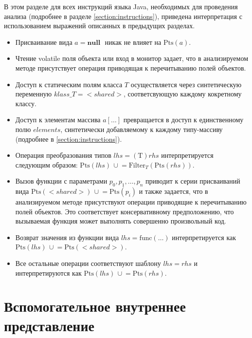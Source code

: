 \documentclass[14pt,titlepage]{extarticle}
\newcommand{\NULL}{\textbf{null }}
\newcommand{\Pts}[1]{\textrm{Pts}(#1)}
\newcommand{\Filter}[2]{\textrm{Filter}_{#1}(#2)}
\newcommand{\cupe}{\,\cup\!\!=}
\newcommand{\eng}[1]{{\English#1}}
\let\oldsection\section
\renewcommand{\section}{\newpage\oldsection}
\begin{document}
      В этом разделе для всех инструкций языка Java, необходимых для проведения
      анализа (подробнее в разделе \ref{section:instructions}), приведена
      интерпретация с использованием выражений описанных в предыдущих разделах.
      \begin{itemize}
        \item Присваивание вида $a = \NULL$ никак не влияет на $\Pts{a}$.
        \item Чтение \eng{volatile} поля объекта или вход в монитор задает, что
              в анализируемом методе присутствует операция приводящая к
              перечитыванию полей объектов.
        \item Доступ к статическим полям класса $T$ осуществляется через
              синтетическую переменную $klass\_T = {<}shared{>}$,
              соответсвующую каждому кокретному классу.
        \item Доступ к элементам массива $a[\ldots]$ превращается в доступ к
              единственному полю $elements$, синтетически добавляемому к
              каждому типу-массиву
              (подробнее в \ref{section:instructions}).
        \item Операция преобразования типов $lhs = (\textrm{T})rhs$
              интерпретируется следующим образом:
              $\Pts{lhs} \cupe \Filter{T}{\Pts{rhs}}$.
        \item Вызов функции с параметрами $p_0, p_1, \ldots, p_n$ приводит к
              серии присваиваний вида $\Pts{{<}shared{>}} \cupe \Pts{p_i}$ и
              также задается, что в анализируемом методе присутствуют операции
              приводящие к перечитыванию полей объектов. Это соответствует
              консервативному предположению, что вызываемая функция может
              выполнять совершенно произвольный код.
        \item Возврат значения из функции вида
              $lhs = \textrm{func}(\ldots)$ интерпретируется как
              $\Pts{lhs} \cupe \Pts{{<}shared{>}}$.
        \item Все остальные операции соответствуют шаблону $lhs = rhs$ и
              интерпретируются как $\Pts{lhs} \cupe \Pts{rhs}$.
      \end{itemize}



  \section{Вспомогательное внутреннее представление}
    \label{section:analysis_aux_ir}
\end{document}
